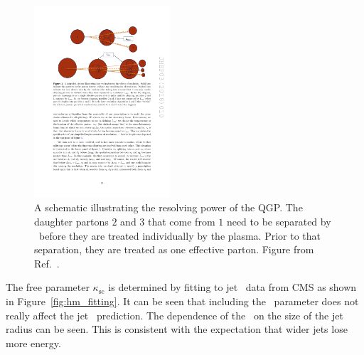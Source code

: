 
\begin{figure}[htbp]
\begin{center}
\includegraphics[width=0.45\textwidth]{figures/jetMeasurements/HM_lres}
\caption{A schematic illustrating the resolving power of the QGP.
The daughter partons $2$ and $3$ that come from $1$ need to be separated by \Lres\ before they are treated individually by the plasma.
Prior to that separation, they are treated as one effective parton.
Figure from Ref.~\cite{Hulcher:2017cpt}.}
\label{fig:hm_lres}
\end{center}
\end{figure}


The free parameter $\kappa_\mathrm{sc}$ is determined by fitting to jet \RAA\ data from CMS \cite{Khachatryan:2016jfl} as shown in Figure~\ref{fig:hm_fitting}.
It can be seen that including the \Lres\ parameter does not really affect the jet \RAA\ prediction.
The dependence of the \RAA\ on the size of the jet radius can be seen.
This is consistent with the expectation that wider jets lose more energy.

